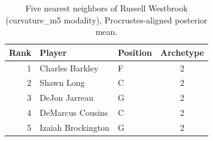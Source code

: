 \begin{table}[htbp]
  \centering\small
  \begin{tabular}{rllc}
    \toprule
    Rank & Player & Position & Archetype \\
    \midrule
    1 & Charles Barkley & F & 2 \\
    2 & Shawn Long & C & 2 \\
    3 & DeJon Jarreau & G & 2 \\
    4 & DeMarcus Cousins & C & 2 \\
    5 & Izaiah Brockington & G & 2 \\
    \bottomrule
  \end{tabular}
  \caption{Five nearest neighbors of Russell Westbrook (curvature_m5 modality), Procrustes-aligned posterior mean.}
  \label{tab:Russell_Westbrook_neighbors_curvature_m5}
\end{table}

